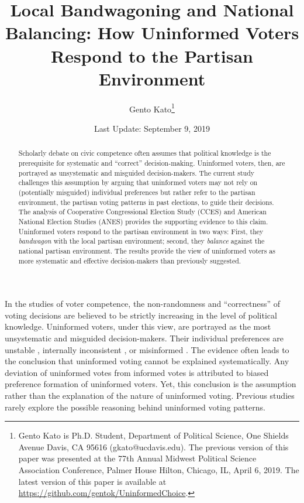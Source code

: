 \documentclass[letterpaper, 12pt]{article}
\title{Local Bandwagoning and National Balancing: How Uninformed Voters Respond to the Partisan Environment} %
\author{Gento Kato\thanks{Gento Kato is Ph.D. Student, Department of Political Science, One Shields Avenue Davis, CA 95616 (gkato@ucdavis.edu). The previous version of this paper was presented at the 77th Annual Midwest Political Science Association Conference, Palmer House Hilton, Chicago, IL, April 6, 2019. The latest version of this paper is available at \url{https://github.com/gentok/UninformedChoice}.}}
\affil{University of California, Davis}
\date{Last Update: September 9, 2019}
\begin{document}
\begin{titlepage}
    
    \singlespace
    \maketitle
    \thispagestyle{empty}
    
    
    \begin{abstract}
        Scholarly debate on civic competence often assumes that political knowledge is the prerequisite for systematic and ``correct'' decision-making. Uninformed voters, then, are portrayed as unsystematic and misguided decision-makers. The current study challenges this assumption by arguing that uninformed voters may not rely on (potentially misguided) individual preferences but rather refer to the partisan environment, the partisan voting patterns in past elections, to guide their decisions. The analysis of Cooperative Congressional Election Study (CCES) and American National Election Studies (ANES) provides the supporting evidence to this claim. Uninformed voters respond to the partisan environment in two ways: First, they \textit{bandwagon} with the local partisan environment; second, they \textit{balance} against the national partisan environment. The results provide the view of uninformed voters as more systematic and effective decision-makers than previously suggested.
    \end{abstract}
    \end{titlepage}
    
    \clearpage
    \doublespace

    \par In the studies of voter competence, the non-randomness and ``correctness'' of voting decisions are believed to be strictly increasing in the level of political knowledge. Uninformed voters, under this view, are portrayed as the most unsystematic and misguided decision-makers. Their individual preferences are unstable \citep{Converse1964thna, Zaller1992thna}, internally inconsistent \citep{Broockman2016apto}, or misinformed \citep{Kuklinski2000mian, Fowler2014thpo}. The evidence often leads to the conclusion that uninformed voting cannot be explained systematically. Any deviation of uninformed votes from informed votes \citep{Bartels1996unvo} is attributed to biased preference formation of uninformed voters. Yet, this conclusion is the assumption rather than the explanation of the nature of uninformed voting. Previous studies rarely explore the possible reasoning behind uninformed voting patterns.
    
\end{document}
